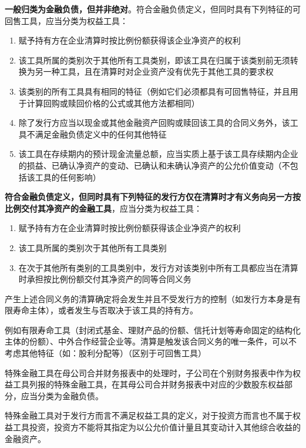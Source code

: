 \documentclass[UTF8,12pt]{ctexart}
\numberwithin{equation}{section} %
\numberwithin{figure}{section}
\numberwithin{table}{section}
\begin{document}
	\textbf{一般归类为金融负债，但并非绝对}。符合金融负债定义，但同时具有下列特征的可回售工具，应当分类为权益工具：
	\begin{enumerate}
		\item 赋予持有方在企业清算时按比例份额获得该企业净资产的权利
		
		\item 该工具所属的类别次于其他所有工具类别，即该工具在归属于该类别前无须转换为另一种工具，且在清算时对企业资产没有优先于其他工具的要求权
		
		\item 该类别的所有工具具有相同的特征（例如它们必须都具有可回售特征，并且用于计算回购或赎回价格的公式或其他方法都相同）
		
		\item 除了发行方应当以现金或其他金融资产回购或赎回该工具的合同义务外，该工具不满足金融负债定义中的任何其他特征
		
		\item 该工具在存续期内的预计现金流量总额，应当实质上基于该工具存续期内企业的损益、已确认净资产的变动、已确认和未确认净资产的公允价值变动（不包括该工具的任何影响）
	\end{enumerate}

	\textbf{符合金融负债定义，但同时具有下列特征的发行方仅在清算时才有义务向另一方按比例交付其净资产的金融工具}，应当分类为权益工具：
	\begin{enumerate}
		\item 赋予持有方在企业清算时按比例份额获得该企业净资产的权利
		
		\item 该工具所属的类别次于其他所有工具类别
		
		\item 在次于其他所有类别的工具类别中，发行方对该类别中所有工具都应当在清算时承担按比例份额交付其净资产的同等合同义务
	\end{enumerate}
	产生上述合同义务的清算确定将会发生并且不受发行方的控制（如发行方本身是有限寿命主体），或者发生与否取决于该工具的持有方。
	
	例如有限寿命工具（封闭式基金、理财产品的份额、信托计划等寿命固定的结构化主体的份额）、中外合作经营企业等。清算是触发该合同义务的唯一条件，可以不考虑其他特征（如：股利分配等）（区别于可回售工具）
	
	特殊金融工具在母公司合并财务报表中的处理时，子公司在个别财务报表中作为权益工具列报的特殊金融工具，在其母公司合并财务报表中对应的少数股东权益部分，应当分类为金融负债。
	
	特殊金融工具对于发行方而言不满足权益工具的定义，对于投资方而言也不属于权益工具投资，投资方不能将其指定为以公允价值计量且其变动计入其他综合收益的金融资产。
	
\end{document}
